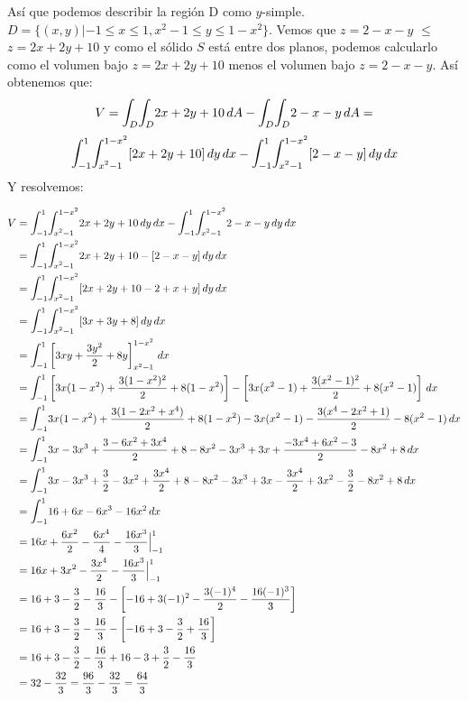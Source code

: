 \documentclass[12pt]{exam}
\begin{document}
\begin{questions}
    Así que podemos describir la región D como $y$-simple.  $D = \{ (x,y)| -1\leq x \leq 1, x^2 -1 \leq y \leq 1-x^2 \}$. Vemos que  $z =2-x-y $ $\leq$  $z = 2x+2y+10$ y como  el sólido $S$ está entre dos planos, podemos calcularlo como el volumen bajo  $z = 2x+2y+10$ menos el volumen bajo $z =2-x-y $. Así obtenemos que:
    \[
    V = \mathlarger{\int}_D \mathlarger{\int}_D 2x+2y+10  \,dA - \mathlarger{\int}_D \mathlarger{\int}_D 2-x-y  \,dA = 
    \]
     \[
     \mathlarger{\int}_{-1}^{1} \mathlarger{\int}_{x^2-1}^{1-x^2}[ 2x+2y+10 ] \,dy \,dx - \mathlarger{\int}_{-1}^{1} \mathlarger{\int}_{x^2-1}^{1-x^2} [ 2-x-y]  \,dy \,dx
     \]
     Y resolvemos:
     
     \begin{align*}
       V&= \mathlarger{\int}_{-1}^{1} \mathlarger{\int}_{x^2-1}^{1-x^2} 2x+2y+10  \,dy \,dx - \mathlarger{\int}_{-1}^{1} \mathlarger{\int}_{x^2-1}^{1-x^2}  2-x-y  \,dy \,dx  \\
       &=\mathlarger{\int}_{-1}^{1} \mathlarger{\int}_{x^2-1}^{1-x^2} 2x+2y+10 - [ 2-x-y]\,dy \,dx  \\
      & =\mathlarger{\int}_{-1}^{1} \mathlarger{\int}_{x^2-1}^{1-x^2} [2x+2y+10   - 2 + x +y] \,dy \,dx  \\
        &=\mathlarger{\int}_{-1}^{1} \mathlarger{\int}_{x^2-1}^{1-x^2} [3x+3y+8]\,dy \,dx  \\
       &=\mathlarger{\int}_{-1}^{1}  \left[ 3xy+\frac{3y^2}{2}+8y \right]_{x^2-1}^{1-x^2} \,dx  \\
        &=\mathlarger{\int}_{-1}^{1}  \left[ 3x(1-x^2)+\frac{3(1-x^2)^2}{2}+8(1-x^2) \right] - \left[ 3x(x^2-1)+\frac{3(x^2-1)^2}{2}+8(x^2-1) \right]  \,dx  \\
       & =\mathlarger{\int}_{-1}^{1}  3x(1-x^2)+\frac{3(1-2x^2+x^4)}{2}+8(1-x^2)- 3x(x^2-1)-\frac{3(x^4-2x^2+1)}{2}-8(x^2-1)   \,dx  \\
        &= \mathlarger{\int}_{-1}^{1}  3x-3x^3+\frac{3-6x^2+3x^4}{2}+8-8x^2- 3x^3+3x+\frac{-3x^4+6x^2-3}{2}-8x^2 + 8   \,dx  \\
       &= \mathlarger{\int}_{-1}^{1}  3x-3x^3+\frac{3}{2} - 3x^2+\frac{3x^4}{2}+8-8x^2- 3x^3+3x-\frac{3x^4}{2} +3x^2 - \frac{3}{2}    -8x^2 + 8   \,dx  \\
       &= \mathlarger{\int}_{-1}^{1}  16 + 6x -6x^3 -16x^2  \,dx  \\
       &=   16x + \frac{6x^2}{2} -\frac{6x^4}{4} - \frac{16x^3}{3}  \Big|_{-1}^1  \\
       &=   16x + 3x^2 -\frac{3x^4}{2} - \frac{16x^3}{3} \Big|_{-1}^1    \\
       &=   16 + 3 -\frac{3}{2} - \frac{16}{3} - \left[ -16 + 3(-1)^2 -\frac{3(-1)^4}{2} - \frac{16(-1)^3}{3}  \right]    \\
       &=   16 + 3 -\frac{3}{2} - \frac{16}{3} - \left[ -16 + 3 -\frac{3}{2} + \frac{16}{3}  \right]    \\
       &=   16 + 3 -\frac{3}{2} - \frac{16}{3}  + 16 - 3 +\frac{3}{2} - \frac{16}{3}  \\
       &= 32-\frac{32}{3} = \frac{96}{3}- \frac{32}{3} = \frac{64}{3}
     \end{align*}



\end{questions}
\end{document}
